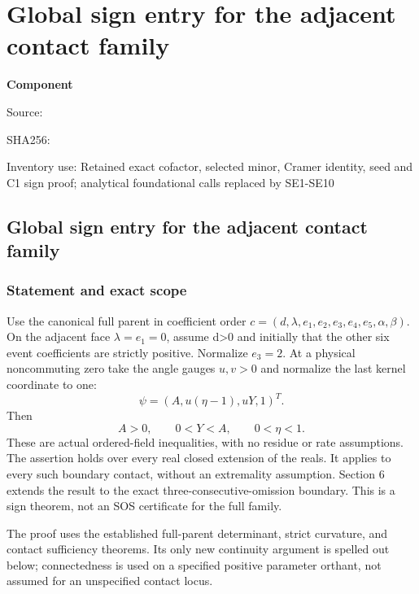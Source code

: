 \chapter{Global sign entry for the adjacent contact family}
\label{component:pe31b9ef5ec43}
\noindent\textbf{Component }\par
{\small\noindent Source: \par}
{\small\noindent SHA256: \par}
{\small\noindent Inventory use: Retained exact cofactor, selected minor, Cramer identity, seed and C1 sign proof; analytical foundational calls replaced by SE1-SE10\par}
\medskip
\hypertarget{global-sign-entry-for-the-adjacent-contact-family}{%
\section{Global sign entry for the adjacent contact family}\label{pe31b9ef5ec43:global-sign-entry-for-the-adjacent-contact-family}}

\hypertarget{statement-and-exact-scope}{%
\subsection{Statement and exact scope}\label{pe31b9ef5ec43:statement-and-exact-scope}}

Use the canonical full parent in coefficient order
\(c=(d,\lambda,e_1,e_2,e_3,e_4,e_5,\alpha,\beta)\).
On the adjacent face \(\lambda=e_1=0\), assume d\textgreater0 and initially that the other six event
coefficients are strictly positive. Normalize \(e_3=2\). At a physical
noncommuting zero take the angle gauges \(u,v>0\) and normalize the last
kernel coordinate to one:
\[
\psi=(A,u(\eta-1),uY,1)^T.
\]
Then
\[
\boxed{A>0,\qquad 0<Y<A,\qquad 0<\eta<1.}
\tag{1}
\]
These are actual ordered-field inequalities, with no residue or rate
assumptions. The assertion holds over every real closed extension of the
reals. It applies to every such boundary contact, without an extremality
assumption. Section 6 extends the result to the exact three-consecutive-omission
boundary. This is a sign theorem, not an SOS certificate for the full family.

The proof uses the established full-parent determinant, strict curvature,
and contact sufficiency theorems. Its only new continuity argument is
spelled out below; connectedness is used on a specified positive parameter
orthant, not assumed for an unspecified contact locus.

